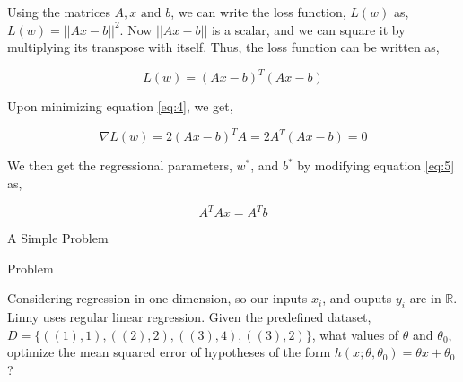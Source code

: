 \documentclass[pdf]{beamer}
\newcounter{myproblem}
\newenvironment{prob}{
  \stepcounter{myproblem}
  \begin{exampleblock}{Problem \themyproblem}
}{
  \end{exampleblock}
}
\begin{document}
    \begin{frame}
        Using the matrices \(A,x\text{ and }b\), we can write the loss function, \(L(w)\) as, \(L(w)=||Ax-b||^2\). Now \(||Ax-b||\) is a scalar, and we can square it by multiplying its transpose with itself. Thus, the loss function can be written as,

        \begin{equation}\label{eq:4}
            L(w)=(Ax-b)^T(Ax-b)
        \end{equation}

        Upon minimizing equation \eqref{eq:4}, we get,

        \begin{equation}\label{eq:5}
            \nabla L(w)=2(Ax-b)^TA=2A^T(Ax-b)=0
        \end{equation}

        We then get the regressional parameters, \(w^*\), and \(b^*\) by modifying equation \eqref{eq:5} as,

        \begin{equation}\label{eq:6}
            A^TAx=A^Tb
        \end{equation}
    \end{frame}

    \begin{frame}{A Simple Problem}
        \begin{prob}
            Considering regression in one dimension, so our inputs \(x_i\), and ouputs \(y_i\) are in \(\mathbb{R}\). Linny uses regular linear regression. Given the predefined dataset, \(D=\{((1),1),((2),2),((3),4),((3),2)\}\), what values of \(\theta\) and \(\theta_0\), optimize the mean squared error of hypotheses of the form \(h(x;\theta,\theta_0)=\theta x+\theta_0\)?
        \end{prob}
    \end{frame}
\end{document}
